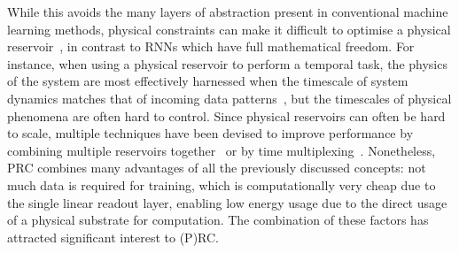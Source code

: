 While this avoids the many layers of abstraction present in conventional machine learning methods, physical constraints can make it difficult to optimise a physical reservoir~\cite{RC_RecentAdvances}, in contrast to RNNs which have full mathematical freedom.
For instance, when using a physical reservoir to perform a temporal task, the physics of the system are most effectively harnessed when the timescale of system dynamics matches that of incoming data patterns~\cite{KUR-24}, but the timescales of physical phenomena are often hard to control.
Since physical reservoirs can often be hard to scale, multiple techniques have been devised to improve performance by combining multiple reservoirs together~\cite{EvaluatingRestrictedESNs,RotatingNeuronsRC} or by time multiplexing~\cite{appeltant2011information}.
Nonetheless, PRC combines many advantages of all the previously discussed concepts: not much data is required for training, which is computationally very cheap due to the single linear readout layer, enabling low energy usage due to the direct usage of a physical substrate for computation.
The combination of these factors has attracted significant interest to (P)RC.

